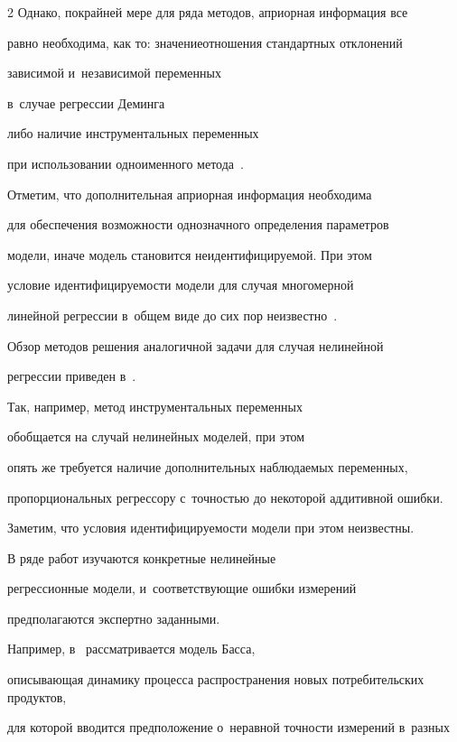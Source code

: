 \begin{multicols}{2}
Однако, по\linebreak крайней мере для ряда методов, априорная инфор\-мация все

равно необходима, как то: значение\linebreak отношения стандартных отклонений

зависимой и~независимой переменных

в~случае регрессии Деминга~\cite{Deming1943Statistical}

либо наличие инструментальных переменных

при использовании одноименного метода~\cite{Bowden1990Instrumental}.

Отметим, что дополнительная априорная информация необходима

для обеспечения воз\-мож\-ности однозначного определения параметров

модели, иначе модель становится неидентифицируемой. При этом

условие идентифицируемости модели для случая многомерной

линейной регрессии в~общем виде до сих пор неизвестно~\cite{Bekker1986Comment}.



Обзор методов решения аналогичной задачи для случая нелинейной

регрессии приведен в~\cite{Carrol06MeasurementErrors}.

Так, например, метод инструментальных переменных

обобщается на случай нелинейных моделей, при этом

опять же требуется наличие дополнительных наблюдаемых переменных,

пропорциональных регрессору с~точ\-ностью до некоторой аддитивной ошибки.

Заметим, что условия иден\-ти\-фи\-ци\-ру\-емости модели при этом неизвестны.



В ряде работ изучаются конкретные нелинейные

регрессионные модели, и~соответствующие ошибки измерений

предполагаются экспертно заданными.

Например, в~\cite{jukic2013nonlinear} рассматривается модель Басса,

описывающая динамику процесса распространения новых потребительских продуктов,

для которой вводится предположение о~неравной точ\-ности измерений в~разных


\end{multicols}
